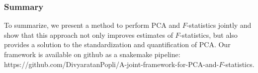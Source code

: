 \documentclass[12pt]{article}
\begin{document}
\subsubsection{Summary}
To summarize, we present a method to perform PCA and $F$-statistics jointly and show that this approach not only improves estimates of $F$-statistics, but also provides a solution to the standardization and quantification of PCA. Our framework is available on github as a snakemake pipeline: https://github.com/DivyaratanPopli/A-joint-framework-for-PCA-and-$F$-statistics.




\end{document}
